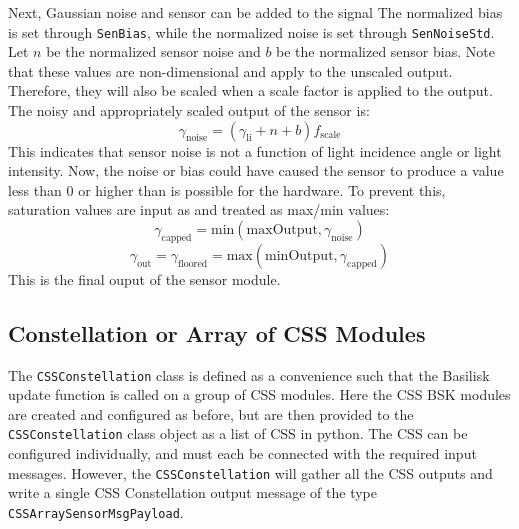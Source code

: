 Next, Gaussian noise and sensor can be added to the signal The normalized bias is set through {\tt SenBias}, while the normalized noise is set through {\tt SenNoiseStd}.   Let $ n$ be the normalized sensor noise and $b$ be the normalized sensor bias.  Note that these values are non-dimensional and apply to the unscaled output.  Therefore, they will also be scaled when a scale factor is applied to the output. The noisy and appropriately scaled output of the sensor is:
\begin{equation}
	\gamma_{\mathrm{noise}} = (\gamma_{\textrm{li}} + n + b) f_{\mathrm{scale}} 
\end{equation}
This indicates that sensor noise is not a function of light incidence angle or light intensity.
Now, the noise or bias could have caused the sensor to produce a value less than 0 or higher than is possible for the hardware. To prevent this, saturation values are input as and treated as max/min values:
\begin{equation}
	\gamma_{\mathrm{capped}} = \mathrm{min}(\mathrm{maxOutput}, \gamma_{\mathrm{noise}})
\end{equation}
\begin{equation}
	\gamma_{\mathrm{out}} = \gamma_{\mathrm{floored}} = \mathrm{max}(\mathrm{minOutput}, \gamma_{\mathrm{capped}})
\end{equation}
This is the final ouput of the sensor module.




\subsection{Constellation or Array of CSS Modules}
The {\tt CSSConstellation} class is defined as a convenience such that the Basilisk update function is called on a group of CSS modules.  Here the CSS BSK modules are created and configured as before, but are then provided to the {\tt CSSConstellation} class object as a list of CSS in python.  The CSS can be configured individually, and must each be connected with the required input messages.  However, the {\tt CSSConstellation} will gather all the CSS outputs and write a single CSS Constellation output message of the type {\tt CSSArraySensorMsgPayload}.  



